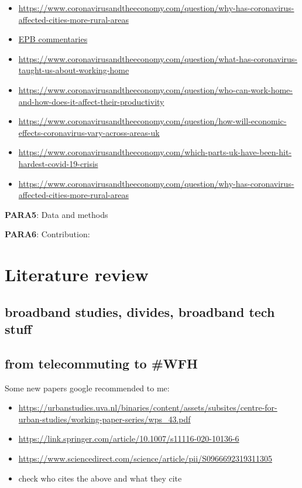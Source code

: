 \documentclass[]{interact}
\theoremstyle{plain}%
\theoremstyle{definition}
\theoremstyle{remark}
\def\tightlist{}
\begin{document}
\begin{itemize}
\tightlist
\item
  \url{https://www.coronavirusandtheeconomy.com/question/why-has-coronavirus-affected-cities-more-rural-areas}
\item
  \href{https://journals.sagepub.com/toc/EPB/current}{EPB commentaries}
\item
  \url{https://www.coronavirusandtheeconomy.com/question/what-has-coronavirus-taught-us-about-working-home}
\item
  \url{https://www.coronavirusandtheeconomy.com/question/who-can-work-home-and-how-does-it-affect-their-productivity}
\item
  \url{https://www.coronavirusandtheeconomy.com/question/how-will-economic-effects-coronavirus-vary-across-areas-uk}
\item
  \url{https://www.coronavirusandtheeconomy.com/which-parts-uk-have-been-hit-hardest-covid-19-crisis}
\item
  \url{https://www.coronavirusandtheeconomy.com/question/why-has-coronavirus-affected-cities-more-rural-areas}
\end{itemize}

\textbf{PARA5}: Data and methods

\textbf{PARA6}: Contribution:

\hypertarget{literature-review}{%
\section{Literature review}\label{literature-review}}

\hypertarget{broadband-studies-divides-broadband-tech-stuff}{%
\subsection{broadband studies, divides, broadband tech
stuff}\label{broadband-studies-divides-broadband-tech-stuff}}

\hypertarget{from-telecommuting-to-wfh}{%
\subsection{from telecommuting to
\#WFH}\label{from-telecommuting-to-wfh}}

Some new papers google recommended to me:

\begin{itemize}
\tightlist
\item
  \url{https://urbanstudies.uva.nl/binaries/content/assets/subsites/centre-for-urban-studies/working-paper-series/wps_43.pdf}
\item
  \url{https://link.springer.com/article/10.1007/s11116-020-10136-6}
\item
  \url{https://www.sciencedirect.com/science/article/pii/S0966692319311305}
\item
  check who cites the above and what they cite
\end{itemize}
\end{document}
